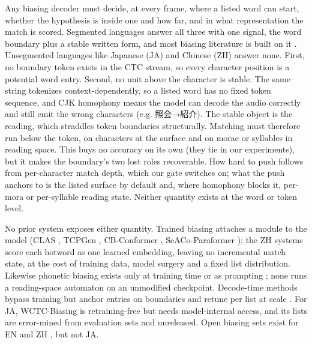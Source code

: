 \documentclass{article}
\begin{document}
Any biasing decoder must decide, at every frame, where a listed word can start, whether the hypothesis is inside one and how far, and in what representation the match is scored. Segmented languages answer all three with one signal, the word boundary plus a stable written form, and most biasing literature is built on it \cite{aleksic15_interspeech,zhao19d_interspeech,sun2021tree,context_trie,andrusenko2025turbobias}. Unsegmented languages like Japanese (JA) and Chinese (ZH) answer none. First, no boundary token exists in the CTC stream, so every character position is a potential word entry. Second, no unit above the character is stable. The same string tokenizes context-dependently, so a listed word has no fixed token sequence, and CJK homophony means the model can decode the audio correctly and still emit the wrong characters (e.g. 照会→紹介). The stable object is the reading, which straddles token boundaries structurally. Matching must therefore run below the token, on characters at the surface and on morae or syllables in reading space. This buys no accuracy on its own (they tie in our experiments), but it makes the boundary's two lost roles recoverable. How hard to push follows from per-character match depth, which our gate switches on; what the push anchors to is the listed surface by default and, where homophony blocks it, per-mora or per-syllable reading state. Neither quantity exists at the word or token level.

No prior system exposes either quantity. Trained biasing attaches a module to the model (CLAS \cite{pundak2018deep}, TCPGen \cite{sun2021tree}, CB-Conformer \cite{xu2023cb}, SeACo-Paraformer \cite{shi2024seaco}); the ZH systems score each hotword as one learned embedding, leaving no incremental match state, at the cost of training data, model surgery and a fixed list distribution. Likewise phonetic biasing exists only at training time \cite{bruguier2019phoebe,chen2019joint} or as prompting \cite{peng24b_interspeech}; none runs a reading-space automaton on an unmodified checkpoint. Decode-time methods bypass training but anchor entries on boundaries and retune per list at scale \cite{aleksic15_interspeech,zhao19d_interspeech,context_trie,andrusenko2025turbobias}. For JA, WCTC-Biasing \cite{nakagome25_interspeech} is retraining-free but needs model-internal access, and its lists are error-mined from evaluation sets and unreleased. Open biasing sets exist for EN \cite{context_trie} and ZH \cite{xu2023cb,shi2024seaco,wang2025contextasr}, but not JA.
\end{document}
